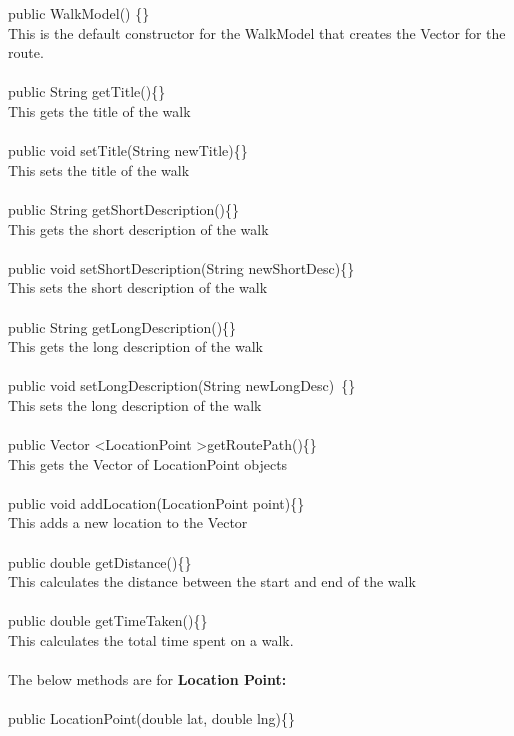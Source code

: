 \documentclass[12pt]{article}
\begin{document}
public WalkModel() \{\}~\\
This is the default constructor for the WalkModel that creates the Vector for the route. ~\\\\
public String getTitle()\{\} ~\\
This gets the title of the walk ~\\\\
public void setTitle(String newTitle)\{\}~\\
This sets the title of the walk ~\\\\
public String getShortDescription()\{\}~\\
This gets the short description of the walk ~\\\\
public void setShortDescription(String newShortDesc)\{\}~\\
This sets the short description of the walk ~\\\\
public String getLongDescription()\{\}~\\
This gets the long description of the walk~\\\\
public void setLongDescription(String newLongDesc)~\{\}~\\
This sets the long description of the walk~\\\\
public Vector \textless LocationPoint \textgreater getRoutePath()\{\}~\\
This gets the Vector of LocationPoint objects~\\\\
public void addLocation(LocationPoint point)\{\}~\\
This adds a new location to the Vector ~\\\\
public double getDistance()\{\}~\\
This calculates the distance between the start and end of the walk ~\\\\
public double getTimeTaken()\{\}~\\
This calculates the total time spent on a walk.
~\\\\
The below methods are for \textbf{Location Point:}~\\\\
public LocationPoint(double lat, double lng)\{\}~\\
\end{document}
